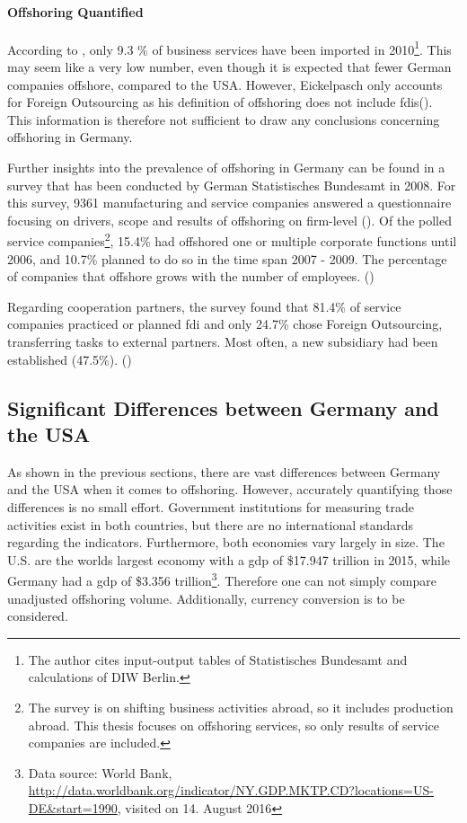 \paragraph{Offshoring Quantified}
According to \cite[p. 70]{Eickelpasch.2015}, only 9.3 \% of business services have been imported in 2010\footnote{The author cites input-output tables of  Statistisches Bundesamt and calculations of DIW Berlin.}. This may seem like a very low number, even though it is expected that fewer German companies offshore, compared to the USA. However, Eickelpasch only accounts for Foreign Outsourcing as his definition of offshoring does not include \glspl{fdi}(\cite[p. 56]{Eickelpasch.2015}). This information is therefore not sufficient to draw any conclusions concerning offshoring in Germany.

Further insights into the prevalence of offshoring in Germany can be found in a survey that has been conducted by German Statistisches Bundesamt in 2008. For this survey, 9361 manufacturing and service companies answered a questionnaire focusing on drivers, scope and results of offshoring on firm-level (\cite[p. 7]{StatistischesBundesamt.2008}). Of the polled service companies\footnote{The survey is on shifting business activities abroad, so it includes production abroad. This thesis focuses on offshoring services, so only results of service companies are included.}, 15.4\% had offshored one or multiple corporate functions until 2006, and 10.7\% planned to do so in the time span 2007 - 2009. The percentage of companies that offshore grows with the number of employees. (\cite[p. 11]{StatistischesBundesamt.2008})

Regarding cooperation partners, the survey found that 81.4\% of service companies practiced or planned \gls{fdi} and only 24.7\% chose Foreign Outsourcing, transferring tasks to external partners. Most often, a new subsidiary had been established (47.5\%). (\cite[p. 18]{StatistischesBundesamt.2008})



\subsection{Significant Differences between Germany and the USA}
\label{sec:DifferencesUSGER}
As shown in the previous sections, there are vast differences between Germany and the USA when it comes to offshoring. However, accurately quantifying those differences is no small effort. Government institutions for measuring trade activities exist in both countries, but there are no international standards regarding the indicators. Furthermore, both economies vary largely in size. The U.S. are the worlds largest economy with a \gls{gdp} of \$17.947 trillion in 2015, while Germany had a \gls{gdp} of \$3.356 trillion\footnote{Data source: World Bank, \url{http://data.worldbank.org/indicator/NY.GDP.MKTP.CD?locations=US-DE&start=1990}, visited on 14. August 2016}. Therefore one can not simply compare unadjusted offshoring volume. Additionally, currency conversion is to be considered. 

